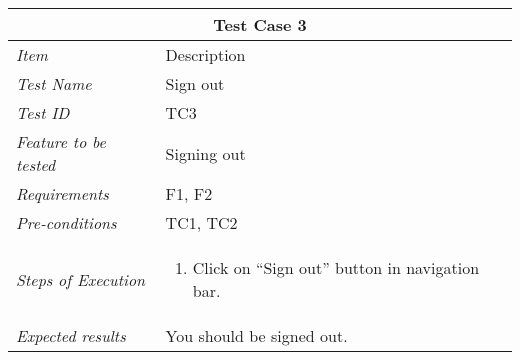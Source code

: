 \begin{minipage}{\linewidth}
\setlength{\tabcolsep}{15pt}
\centering
{}
\begin{tabular}{ |l|p{70mm}| }
	\hline
	\multicolumn{2}{|c|}{\cellcolor{gray!25} \textbf{Test Case 3}} \\
	\hline
	\it{\cellcolor{gray!25}Item} & {\cellcolor{gray!25} Description } \\
	\hline
	\it{\cellcolor{gray!25}Test Name } & Sign out \\ \hline
	\it{\cellcolor{gray!25}Test ID} & TC3 \\ \hline
	\it{\cellcolor{gray!25}Feature to be tested} & Signing out \\ \hline
	\it{\cellcolor{gray!25}Requirements} & F1, F2  \\ \hline
	\it{\cellcolor{gray!25}Pre-conditions} & TC1, TC2  \\ \hline
	\it{\cellcolor{gray!25}Steps of Execution} & \begin{enumerate}
	                                       \item Click on “Sign out” button in navigation bar.
	                                     \end{enumerate} \\ \hline
	\it{\cellcolor{gray!25}Expected results} & You should be signed out. \\
	\hline
\end{tabular}
\medskip
\end{minipage}
%
